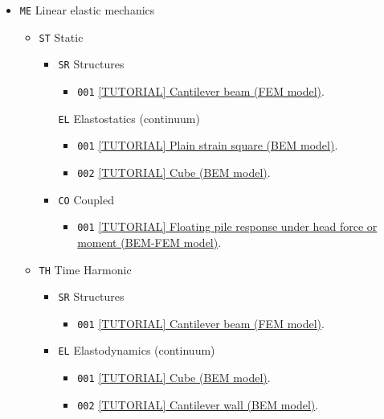 \documentclass{article}
\begin{document}
\begin{itemize}
    \item \texttt{ME} Linear elastic mechanics
    \begin{itemize}
        \item \texttt{ST} Static
        \begin{itemize}
            \item \texttt{SR} Structures
            \begin{itemize}
                \item \texttt{001} \href{ME-ST-SR-001/}{[TUTORIAL] Cantilever beam (FEM model)}.
            \end{itemize}
            \item[\texttt{EL}] Elastostatics (continuum)
            \begin{itemize}
                \item \texttt{001} \href{ME-ST-EL-001/}{[TUTORIAL] Plain strain square (BEM model)}.
                \item \texttt{002} \href{ME-ST-EL-002/}{[TUTORIAL] Cube (BEM model)}.
            \end{itemize}            
            \item \texttt{CO} Coupled 
            \begin{itemize}
                \item \texttt{001} \href{ME-ST-CO-001/}{[TUTORIAL] Floating pile response under head force or moment (BEM-FEM model)}.
            \end{itemize}             
        \end{itemize}
        \item \texttt{TH} Time Harmonic
        \begin{itemize}
            \item \texttt{SR} Structures
            \begin{itemize}
                \item \texttt{001} \href{ME-TH-SR-001/}{[TUTORIAL] Cantilever beam (FEM model)}.
            \end{itemize}             
            \item \texttt{EL} Elastodynamics (continuum)
            \begin{itemize}
                \item \texttt{001} \href{ME-TH-EL-001/}{[TUTORIAL] Cube (BEM model)}.
                \item \texttt{002} \href{ME-TH-EL-002/}{[TUTORIAL] Cantilever wall (BEM model)}.

\end{itemize}
\end{itemize}
\end{itemize}
\end{itemize}
\end{document}
